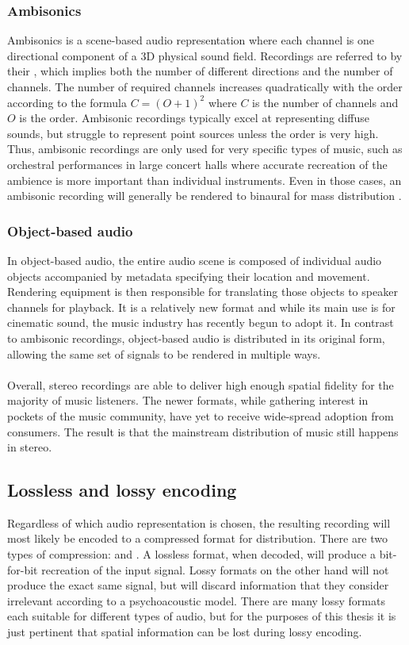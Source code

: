 \subsubsection*{Ambisonics}
Ambisonics is a scene-based audio representation where each channel is one directional component of a 3D physical sound field. Recordings are referred to by their , which implies both the number of different directions and the number of channels. The number of required channels increases quadratically with the order according to the formula $C=(O + 1)^2$ where $C$ is the number of channels and $O$ is the order. Ambisonic recordings typically excel at representing diffuse sounds, but struggle to represent point sources unless the order is very high. Thus, ambisonic recordings are only used for very specific types of music, such as orchestral performances in large concert halls where accurate recreation of the ambience is more important than individual instruments. Even in those cases, an ambisonic recording will generally be rendered to binaural for mass distribution \cite{churnsideAmbisonicsPeriphony2010}.

\subsubsection*{Object-based audio}
In object-based audio, the entire audio scene is composed of individual audio objects accompanied by metadata specifying their location and movement. Rendering equipment is then responsible for translating those objects to speaker channels for playback. It is a relatively new format and while its main use is for cinematic sound, the music industry has recently begun to adopt it. In contrast to ambisonic recordings, object-based audio is distributed in its original form, allowing the same set of signals to be rendered in multiple ways.
\\\\
Overall, stereo recordings are able to deliver high enough spatial fidelity for the majority of music listeners. The newer formats, while gathering interest in pockets of the music community, have yet to receive wide-spread adoption from consumers. The result is that the mainstream distribution of music still happens in stereo.

\subsection{Lossless and lossy encoding}
Regardless of which audio representation is chosen, the resulting recording will most likely be encoded to a compressed format for distribution. There are two types of compression:  and . A lossless format, when decoded, will produce a bit-for-bit recreation of the input signal. Lossy formats on the other hand will not produce the exact same signal, but will discard information that they consider irrelevant according to a psychoacoustic model. There are many lossy formats each suitable for different types of audio, but for the purposes of this thesis it is just pertinent that spatial information can be lost during lossy encoding.

